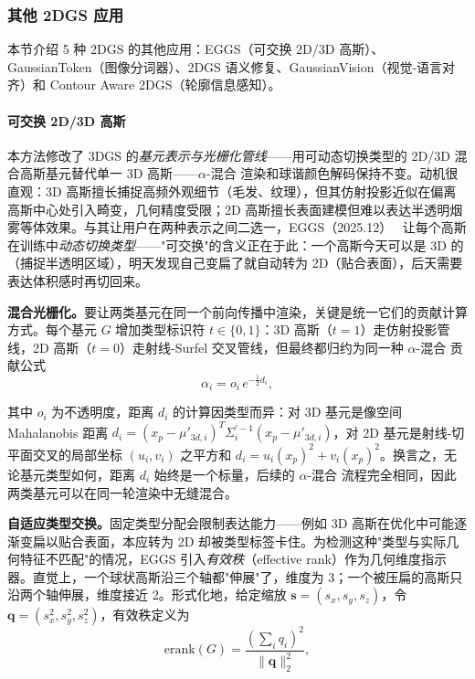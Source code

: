 \subsubsection{其他 2DGS 应用}

本节介绍 5 种 2DGS 的其他应用：EGGS（可交换 2D/3D 高斯）、GaussianToken（图像分词器）、2DGS 语义修复、GaussianVision（视觉-语言对齐）和 Contour Aware 2DGS（轮廓信息感知）。

\paragraph{可交换 2D/3D 高斯}

本方法修改了 3DGS 的\emph{基元表示与光栅化管线}——用可动态切换类型的 2D/3D 混合高斯基元替代单一 3D 高斯——$\alpha$-混合 渲染和球谐颜色解码保持不变。动机很直观：3D 高斯擅长捕捉高频外观细节（毛发、纹理），但其仿射投影近似在偏离高斯中心处引入畸变，几何精度受限；2D 高斯擅长表面建模但难以表达半透明烟雾等体效果。与其让用户在两种表示之间二选一，EGGS（2025.12）~\cite{2512_02932} 让每个高斯在训练中\emph{动态切换类型}——"可交换"的含义正在于此：一个高斯今天可以是 3D 的（捕捉半透明区域），明天发现自己变扁了就自动转为 2D（贴合表面），后天需要表达体积感时再切回来。

\textbf{混合光栅化。}要让两类基元在同一个前向传播中渲染，关键是统一它们的贡献计算方式。每个基元 $G$ 增加类型标识符 $t \in \{0,1\}$：3D 高斯（$t=1$）走仿射投影管线，2D 高斯（$t=0$）走射线-Surfel 交叉管线，但最终都归约为同一种 $\alpha$-混合 贡献公式
\begin{equation}
\alpha_i = o_i \, e^{-\frac{1}{2}d_i},
\end{equation}

其中 $o_i$ 为不透明度，距离 $d_i$ 的计算因类型而异：对 3D 基元是像空间 Mahalanobis 距离 $d_i = (x_p - \mu'_{3d,i})^T \Sigma_i^{\prime-1}(x_p - \mu'_{3d,i})$，对 2D 基元是射线-切平面交叉的局部坐标 $(u_i, v_i)$ 之平方和 $d_i = u_i(x_p)^2 + v_i(x_p)^2$。换言之，无论基元类型如何，距离 $d_i$ 始终是一个标量，后续的 $\alpha$-混合 流程完全相同，因此两类基元可以在同一轮渲染中无缝混合。

\textbf{自适应类型交换。}固定类型分配会限制表达能力——例如 3D 高斯在优化中可能逐渐变扁以贴合表面，本应转为 2D 却被类型标签卡住。为检测这种"类型与实际几何特征不匹配"的情况，EGGS 引入\emph{有效秩}（effective rank）作为几何维度指示器。直觉上，一个球状高斯沿三个轴都"伸展"了，维度为 3；一个被压扁的高斯只沿两个轴伸展，维度接近 2。形式化地，给定缩放 $\mathbf{s}=(s_x,s_y,s_z)$，令 $\mathbf{q}=(s_x^2,s_y^2,s_z^2)$，有效秩定义为
\begin{equation}
\mathrm{erank}(G) = \frac{\left(\sum_{i} q_i\right)^2}{\|\mathbf{q}\|_2^2},
\end{equation}

